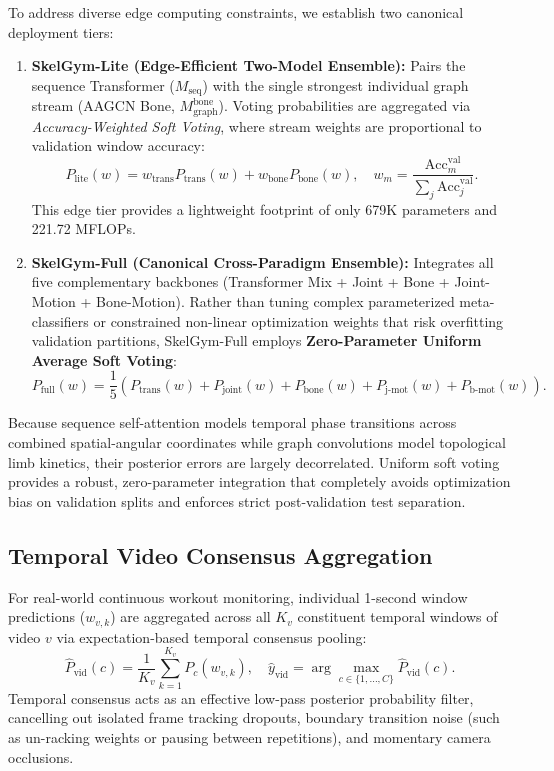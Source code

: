 \documentclass[preprint,12pt]{elsarticle}
\begin{document}
To address diverse edge computing constraints, we establish two canonical deployment tiers:
\begin{enumerate}
    \item \textbf{SkelGym-Lite (Edge-Efficient Two-Model Ensemble):} Pairs the sequence Transformer ($M_{\text{seq}}$) with the single strongest individual graph stream (AAGCN Bone, $M_{\text{graph}}^{\text{bone}}$). Voting probabilities are aggregated via \textit{Accuracy-Weighted Soft Voting}, where stream weights are proportional to validation window accuracy:
    \begin{equation}
        P_{\text{lite}}(w) = w_{\text{trans}} P_{\text{trans}}(w) + w_{\text{bone}} P_{\text{bone}}(w), \quad w_m = \frac{\text{Acc}_m^{\text{val}}}{\sum_{j} \text{Acc}_j^{\text{val}}}.
    \end{equation}
    This edge tier provides a lightweight footprint of only 679K parameters and 221.72 MFLOPs.
    \item \textbf{SkelGym-Full (Canonical Cross-Paradigm Ensemble):} Integrates all five complementary backbones (Transformer Mix + Joint + Bone + Joint-Motion + Bone-Motion). Rather than tuning complex parameterized meta-classifiers or constrained non-linear optimization weights that risk overfitting validation partitions, SkelGym-Full employs \textbf{Zero-Parameter Uniform Average Soft Voting}:
    \begin{equation}
    \label{eq:uniform_soft}
        P_{\text{full}}(w) = \frac{1}{5} \left( P_{\text{trans}}(w) + P_{\text{joint}}(w) + P_{\text{bone}}(w) + P_{\text{j-mot}}(w) + P_{\text{b-mot}}(w) \right).
    \end{equation}
\end{enumerate}
Because sequence self-attention models temporal phase transitions across combined spatial-angular coordinates while graph convolutions model topological limb kinetics, their posterior errors are largely decorrelated. Uniform soft voting provides a robust, zero-parameter integration that completely avoids optimization bias on validation splits and enforces strict post-validation test separation.

\subsection{Temporal Video Consensus Aggregation}
For real-world continuous workout monitoring, individual 1-second window predictions ($w_{v, k}$) are aggregated across all $K_v$ constituent temporal windows of video $v$ via expectation-based temporal consensus pooling:
\begin{equation}
    \hat{P}_{\text{vid}}(c) = \frac{1}{K_v} \sum_{k=1}^{K_v} P_c(w_{v, k}), \quad \hat{y}_{\text{vid}} = \arg\max_{c \in \{1, \dots, C\}} \hat{P}_{\text{vid}}(c).
\end{equation}
Temporal consensus acts as an effective low-pass posterior probability filter, cancelling out isolated frame tracking dropouts, boundary transition noise (such as un-racking weights or pausing between repetitions), and momentary camera occlusions.
\end{document}
